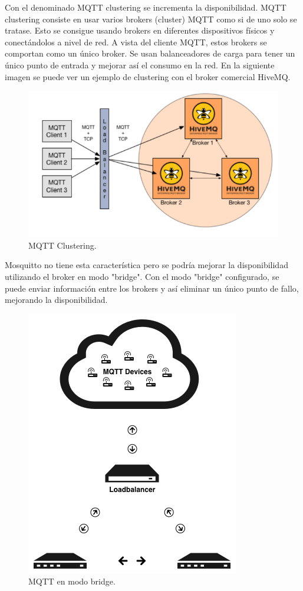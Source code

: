 \documentclass[12pt, twoside]{book}
\begin{document}
Con el denominado MQTT clustering se incrementa la disponibilidad. MQTT clustering consiste en usar varios brokers (cluster) MQTT como si de uno solo se tratase. Esto se consigue usando brokers en diferentes dispositivos físicos y conectándolos a nivel de red. A vista del cliente MQTT, estos brokers se comportan como un único broker. Se usan balanceadores de carga para tener un único punto de entrada y mejorar así el consumo en la red. En la siguiente imagen se puede ver un ejemplo de clustering con el broker comercial HiveMQ.
\begin{figure}[H]
\centering
\includegraphics[scale=0.3]{images/mqtt_clustering.png}
\caption{MQTT Clustering.}\label{L406}
\end{figure}

Mosquitto no tiene esta característica pero se podría mejorar la disponibilidad utilizando el broker en modo "bridge". Con el modo "bridge" configurado, se puede enviar información entre los brokers y así eliminar un único punto de fallo, mejorando la disponibilidad. 
\begin{figure}[H]
\centering
\includegraphics[scale=0.3]{images/mqtt_availability.png}
\caption{MQTT en modo bridge.}\label{L405}
\end{figure}
\end{document}
